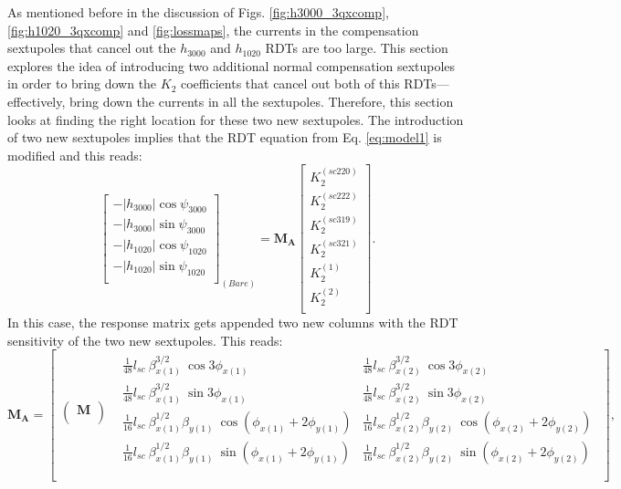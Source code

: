 As mentioned before in the discussion of Figs. \ref{fig:h3000_3qxcomp}, \ref{fig:h1020_3qxcomp} and \ref{fig:lossmaps}, the currents in the compensation sextupoles that cancel out the $h_{3000}$ and $h_{1020}$ RDTs are too large. This section explores the idea of introducing two additional normal compensation sextupoles in order to bring down the $K_2$ coefficients that cancel out both of this RDTs---effectively, bring down the currents in all the sextupoles. Therefore, this section looks at finding the right location for these two new sextupoles. The introduction of two new sextupoles implies that the RDT equation from Eq. \ref{eq:model1} is modified and this reads:
\begin{equation}
    \begin{bmatrix}
        -|h_{3000}| \cos \psi_{3000} \\
        -|h_{3000}| \sin \psi_{3000} \\
        -|h_{1020}| \cos \psi_{1020} \\
        -|h_{1020}| \sin \psi_{1020} \\
        \end{bmatrix}_{(Bare)}
         =
        \boldsymbol{M_A}
        \begin{bmatrix}
        K_2^{(sc220)} \\
        K_2^{(sc222)}\\
        K_2^{(sc319)} \\
        K_2^{(sc321)}\\
        K_2^{(1)} \\
        K_2^{(2)}\\
        \end{bmatrix}.
        \label{eq:systemadd}
\end{equation}
In this case, the response matrix gets appended two new columns with the RDT sensitivity of the two new sextupoles. This reads:
\begin{equation}
    \boldsymbol{M_A} =
\begin{bmatrix}
\begin{pmatrix}  \boldsymbol{M} \\ \end{pmatrix} 
& \begin{matrix} \frac{1}{48} l_{sc} \: \beta^{3/2}_{x(1)} \: \cos 3\phi_{x(1)} & \frac{1}{48} l_{sc} \: \beta^{3/2}_{x(2)} \: \cos 3\phi_{x(2)} \\ 
 \frac{1}{48} l_{sc} \: \beta^{3/2}_{x(1)} \: \sin 3\phi_{x(1)} & \frac{1}{48} l_{sc} \: \beta^{3/2}_{x(2)} \: \sin 3\phi_{x(2)}  \\ 
 \frac{1}{16} l_{sc} \: \beta^{1/2}_{x(1)} \beta_{y(1)} \: \cos \left( \phi_{x(1)} + 2\phi_{y(1)} \right) &  \frac{1}{16} l_{sc} \: \beta^{1/2}_{x(2)} \beta_{y(2)} \: \cos \left( \phi_{x(2)} + 2\phi_{y(2)} \right)\\ 
 \frac{1}{16} l_{sc} \: \beta^{1/2}_{x(1)} \beta_{y(1)} \: \sin \left( \phi_{x(1)} + 2\phi_{y(1)} \right) &  \frac{1}{16} l_{sc} \: \beta^{1/2}_{x(2)} \beta_{y(2)} \: \sin \left( \phi_{x(2)} + 2\phi_{y(2)} \right)\\  
\end{matrix}\\
\end{bmatrix},
\end{equation}
